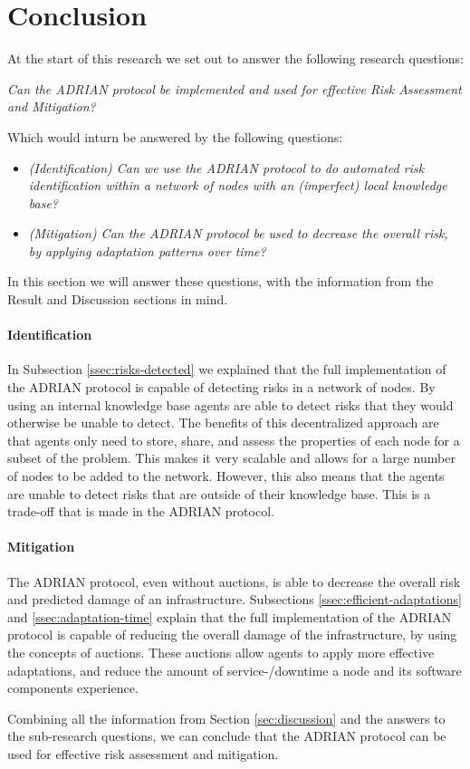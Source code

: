 \section{Conclusion}
\label{sec:conclusion}

At the start of this research we set out to answer the following research questions:

\vspace{0.5em}
\emph{Can the ADRIAN protocol be implemented and used for effective Risk Assessment and Mitigation?}
\vspace{0.5em}

Which would inturn be answered by the following questions: 
\begin{itemize}
    \item \textit{(Identification) Can we use the ADRIAN protocol to do automated risk identification within a network of nodes with an (imperfect) local knowledge base?}
    \item \textit{(Mitigation) Can the ADRIAN protocol be used to decrease the overall risk, by applying adaptation patterns over time?}
\end{itemize}

In this section we will answer these questions, with the information from the Result and Discussion sections in mind.

\paragraph*{Identification}
In Subsection \ref{ssec:risks-detected} we explained that the full implementation of the ADRIAN protocol is capable of detecting risks in a network of nodes. By using an internal knowledge base agents are able to detect risks that they would otherwise be unable to detect. The benefits of this decentralized approach are that agents only need to store, share, and assess the properties of each node for a subset of the problem. This makes it very scalable and allows for a large number of nodes to be added to the network. However, this also means that the agents are unable to detect risks that are outside of their knowledge base. This is a trade-off that is made in the ADRIAN protocol. 

\paragraph*{Mitigation}
The ADRIAN protocol, even without auctions, is able to decrease the overall risk and predicted damage of an infrastructure.
Subsections \ref{ssec:efficient-adaptations} and \ref{ssec:adaptation-time} explain that the full implementation of the ADRIAN protocol is capable of reducing the overall damage of the infrastructure, by using the concepts of auctions. These auctions allow agents to apply more effective adaptations, and reduce the amount of service-/downtime a node and its software components experience. 


\vspace{0.5em}
Combining all the information from Section \ref{sec:discussion} and the answers to the sub-research questions, we can conclude that the ADRIAN protocol can be used for effective risk assessment and mitigation. 

